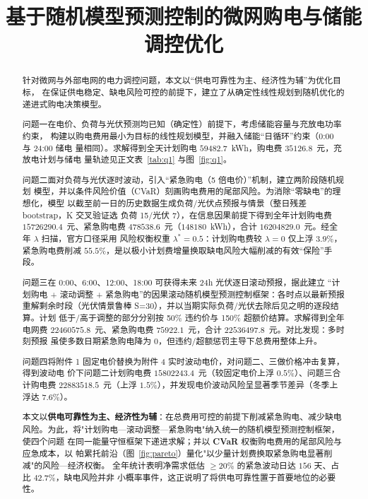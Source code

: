 \documentclass[withoutpreface]{cumcmthesis}
\title{基于随机模型预测控制的微网购电与储能调控优化}
\begin{document}
\maketitle

\begin{abstract}
    针对微网与外部电网的电力调控问题，本文以“供电可靠性为主、经济性为辅”为优化目标，
    在保证供电稳定、缺电风险可控的前提下，建立了从确定性线性规划到随机优化的递进式购电决策模型。

    问题一在电价、负荷与光伏预测均已知（确定性）前提下，考虑储能容量与充放电功率约束，
    构建以购电费用最小为目标的线性规划模型，并融入储能“日循环”约束（0:00 与 24:00 储电
    量相同）。求解得到全天计划购电 $59482.7$~kWh，购电费 $35126.8$~元，充放电计划与储电
    量轨迹见正文表~\ref{tab:q1} 与图~\ref{fig:q1}。

    问题二面对负荷与光伏逐时波动，引入“紧急购电（5 倍电价）”机制，建立两阶段随机规划
    模型，并以条件风险价值（CVaR）刻画购电费用的尾部风险。为消除“零缺电”的理想化，模型
    以截至前一日的历史数据生成负荷/光伏点预报与情景（整日残差 bootstrap，K 交叉验证选
    负荷 15/光伏 7），在信息因果前提下得到全年计划购电费 $15726290.4$~元、紧急购电费
    $478538.6$~元（$148180$~kWh），合计 $16204829.0$~元。经全年 $\lambda$ 扫描，官方口径采用
    风险权衡权重 $\lambda^*=0.5$：计划购电费较 $\lambda=0$ 仅上浮 $3.9\%$，紧急购电费削减
    $55.5\%$，是以极小计划费增量换取缺电风险大幅削减的有效“保险”手段。

    问题三在 0:00、6:00、12:00、18:00 可获得未来 24h 光伏逐日滚动预报，据此建立
    “计划购电 + 滚动调整 + 紧急购电”的因果滚动随机模型预测控制框架：各时点以最新预报
    重解剩余时段（光伏情景鲁棒 S=30），并以当期实际负荷/光伏去除后见之明的逐段结算。计划
    低于/高于调整的部分分别按 50\% 违约价与 150\% 超额价结算。求解得到全年电网费
    $22460575.8$~元、紧急购电费 $75922.1$~元，合计 $22536497.8$~元。对比发现：多时刻预报
    虽使多数日期紧急购电降为 0，但违约/超额惩罚主导下总费用整体上升。

    问题四将附件 1 固定电价替换为附件 4 实时波动电价，对问题二、三做价格冲击复算，得到波动电
    价下问题二计划购电费 $15802243.4$~元（较固定电价上浮 $0.5\%$）、问题三合计购电费
    $22883518.5$~元（上浮 $1.5\%$），并发现电价波动风险呈显著季节差异（冬季上浮达 $7.6\%$）。

    本文以\textbf{供电可靠性为主、经济性为辅}：在总费用可控的前提下削减紧急购电、减少缺电
    风险。为此，将"计划购电—滚动调整—紧急购电"纳入统一的随机模型预测控制框架，使四个问题
    在同一能量守恒框架下递进求解；并以 \textbf{CVaR} 权衡购电费用的尾部风险与应急成本，以
    帕累托前沿（图~\ref{fig:pareto}）量化"以少量计划费换取紧急购电显著削减"的风险—经济权衡。
    全年统计表明净需求低估 $\ge20\%$ 的紧急波动日达 $156$ 天、占比 $42.7\%$，缺电风险并非
    小概率事件，这正说明了将供电可靠性置于首要地位的必要性。

\end{abstract}
\end{document}
